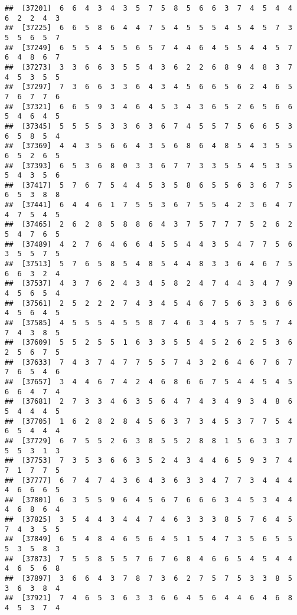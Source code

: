 \documentclass[
]{book}
\begin{document}
\begin{verbatim}
##  [37201]  6  6  4  3  4  3  5  7  5  8  5  6  6  3  7  4  5  4  4  6  2  2  4  3
##  [37225]  6  6  5  8  6  4  4  7  5  4  5  5  5  4  5  4  5  7  3  5  5  6  5  7
##  [37249]  6  5  5  4  5  5  6  5  7  4  4  6  4  5  5  4  4  5  7  6  4  8  6  7
##  [37273]  3  3  6  6  3  5  5  4  3  6  2  2  6  8  9  4  8  3  7  4  5  3  5  5
##  [37297]  7  3  6  6  3  3  6  4  3  4  5  6  6  5  6  2  4  6  5  7  6  7  7  6
##  [37321]  6  6  5  9  3  4  6  4  5  3  4  3  6  5  2  6  5  6  6  5  4  6  4  5
##  [37345]  5  5  5  5  3  3  6  3  6  7  4  5  5  7  5  6  6  5  3  6  5  8  5  4
##  [37369]  4  4  3  5  6  6  4  3  5  6  8  6  4  8  5  4  3  5  5  6  5  2  6  5
##  [37393]  6  5  3  6  8  0  3  3  6  7  7  3  3  5  5  4  5  3  5  5  4  3  5  6
##  [37417]  5  7  6  7  5  4  4  5  3  5  8  6  5  5  6  3  6  7  5  6  5  3  8  8
##  [37441]  6  4  4  6  1  7  5  5  3  6  7  5  5  4  2  3  6  4  7  4  7  5  4  5
##  [37465]  2  6  2  8  5  8  8  6  4  3  7  5  7  7  7  5  2  6  2  5  4  7  6  5
##  [37489]  4  2  7  6  4  6  6  4  5  5  4  4  3  5  4  7  7  5  6  3  5  5  7  5
##  [37513]  5  7  6  5  8  5  4  8  5  4  4  8  3  3  6  4  6  7  5  6  6  3  2  4
##  [37537]  4  3  7  6  2  4  3  4  5  8  2  4  7  4  4  3  4  7  9  4  5  6  5  4
##  [37561]  2  5  2  2  2  7  4  3  4  5  4  6  7  5  6  3  3  6  6  4  5  6  4  5
##  [37585]  4  5  5  5  4  5  5  8  7  4  6  3  4  5  7  5  5  7  4  7  4  3  8  5
##  [37609]  5  5  2  5  5  1  6  3  3  5  5  4  5  2  6  2  5  3  6  2  5  6  7  5
##  [37633]  7  4  3  7  4  7  7  5  5  7  4  3  2  6  4  6  7  6  7  7  6  5  4  6
##  [37657]  3  4  4  6  7  4  2  4  6  8  6  6  7  5  4  4  5  4  5  6  6  4  7  4
##  [37681]  2  7  3  3  4  6  3  5  6  4  7  4  3  4  9  3  4  8  6  5  4  4  4  5
##  [37705]  1  6  2  8  2  8  4  5  6  3  7  3  4  5  3  7  7  5  4  6  5  4  4  4
##  [37729]  6  7  5  5  2  6  3  8  5  5  2  8  8  1  5  6  3  3  7  5  5  3  1  3
##  [37753]  7  3  5  3  6  6  3  5  2  4  3  4  4  6  5  9  3  7  4  7  1  7  7  5
##  [37777]  6  7  4  7  4  3  6  4  3  6  3  3  4  7  7  3  4  4  4  4  6  6  6  5
##  [37801]  6  3  5  5  9  6  4  5  6  7  6  6  6  3  4  5  3  4  4  4  6  8  6  4
##  [37825]  3  5  4  4  3  4  4  7  4  6  3  3  3  8  5  7  6  4  5  7  4  3  5  5
##  [37849]  6  5  4  8  4  6  5  6  4  5  1  5  4  7  3  5  6  5  5  5  3  5  8  3
##  [37873]  7  5  5  8  5  5  7  6  7  6  8  4  6  6  5  4  5  4  4  4  6  5  6  8
##  [37897]  3  6  6  4  3  7  8  7  3  6  2  7  5  7  5  3  3  8  5  3  6  3  8  4
##  [37921]  7  4  6  5  3  6  3  3  6  6  4  5  6  4  4  6  4  6  8  4  5  3  7  4

\end{verbatim}
\end{document}
